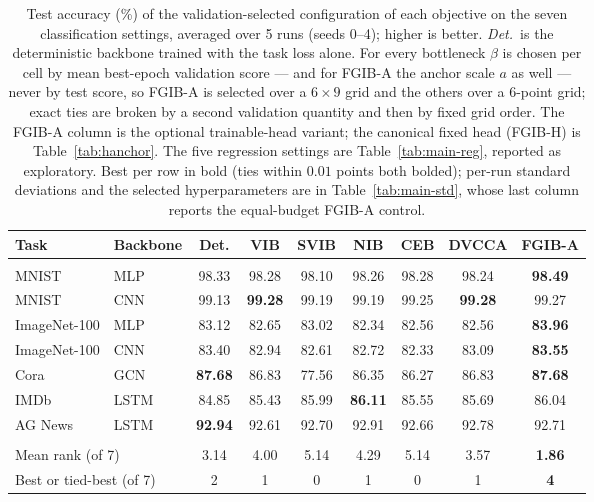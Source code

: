 \begin{table}[t]
\caption{Test accuracy (\%) of the validation-selected configuration of each objective on the seven classification settings, averaged over 5 runs (seeds 0--4); higher is better. \emph{Det.}\ is the deterministic backbone trained with the task loss alone. For every bottleneck $\beta$ is chosen per cell by mean best-epoch validation score --- and for FGIB-A the anchor scale $a$ as well --- never by test score, so FGIB-A is selected over a $6\times9$ grid and the others over a $6$-point grid; exact ties are broken by a second validation quantity and then by fixed grid order. The FGIB-A column is the optional trainable-head variant; the canonical fixed head (FGIB-H) is Table~\ref{tab:hanchor}. The five regression settings are Table~\ref{tab:main-reg}, reported as exploratory. Best per row in bold (ties within $0.01$ points both bolded); per-run standard deviations and the selected hyperparameters are in Table~\ref{tab:main-std}, whose last column reports the equal-budget FGIB-A control.}
\label{tab:main}
\begin{center}\footnotesize
\begin{tabular}{llccccccc}
Task & Backbone & Det. & VIB & SVIB & NIB & CEB & DVCCA & \textbf{FGIB-A} \\ \hline \\[-1.8ex]
MNIST & MLP & 98.33 & 98.28 & 98.10 & 98.26 & 98.28 & 98.24 & \textbf{98.49} \\
MNIST & CNN & 99.13 & \textbf{99.28} & 99.19 & 99.19 & 99.25 & \textbf{99.28} & 99.27 \\
ImageNet-100 & MLP & 83.12 & 82.65 & 83.02 & 82.34 & 82.56 & 82.56 & \textbf{83.96} \\
ImageNet-100 & CNN & 83.40 & 82.94 & 82.61 & 82.72 & 82.33 & 83.09 & \textbf{83.55} \\
Cora & GCN & \textbf{87.68} & 86.83 & 77.56 & 86.35 & 86.27 & 86.83 & \textbf{87.68} \\
IMDb & LSTM & 84.85 & 85.43 & 85.99 & \textbf{86.11} & 85.55 & 85.69 & 86.04 \\
AG News & LSTM & \textbf{92.94} & 92.61 & 92.70 & 92.91 & 92.66 & 92.78 & 92.71 \\
\hline \\[-1.8ex]
\multicolumn{2}{l}{Mean rank (of 7)} & 3.14 & 4.00 & 5.14 & 4.29 & 5.14 & 3.57 & \textbf{1.86} \\
\multicolumn{2}{l}{Best or tied-best (of 7)} & 2 & 1 & 0 & 1 & 0 & 1 & \textbf{4} \\
\end{tabular}\end{center}\end{table}
